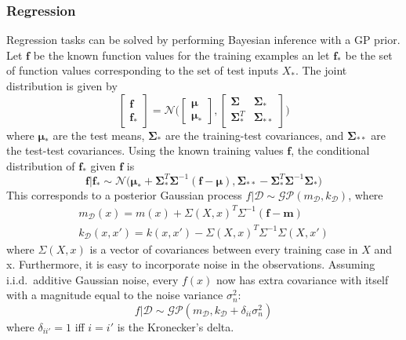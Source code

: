 \documentclass{article}
\begin{document}
\subsubsection{Regression}
Regression tasks can be solved by performing Bayesian inference with a GP prior. Let $\mathbf{f}$ be the known function values for the training examples an let $\mathbf{f}_*$ be the set of function values corresponding to the set of test inputs $X_*$. The joint distribution is given by
\begin{equation*}
\begin{bmatrix} \mathbf{f} \\ \mathbf{f}_* \end{bmatrix} 
= 
\mathcal{N}\Big(\begin{bmatrix} \bm{\mu} \\ \bm{\mu}_* \end{bmatrix}, \begin{bmatrix}\bm{\Sigma} & \bm{\Sigma}_* \\ \bm{\Sigma}_*^T & \bm{\Sigma}_{**} \end{bmatrix} \Big)
\end{equation*}
where $\bm{\mu}_*$ are the test means, $\bm{\Sigma}_*$ are the training-test covariances, and $\bm{\Sigma}_{**}$ are the test-test covariances. Using the known training values $\mathbf{f}$, the conditional distribution of $\mathbf{f}_*$ given $\mathbf{f}$ is
\begin{equation*}
	\mathbf{f} \big\vert \mathbf{f}_* \sim
	\mathcal{N} \big( \bm{\mu}_* + \mathbf{\Sigma}_*^T \mathbf{\Sigma}^{-1}(\mathbf{f}-\bm{\mu}), \mathbf{\Sigma}_{**} - \mathbf{\Sigma}^T_*\mathbf{\Sigma}^{-1}\mathbf{\Sigma}_* \big)
\end{equation*}
This corresponds to a posterior Gaussian process $f \big\vert \mathcal{D} \sim \mathcal{GP}(m_\mathcal{D}, k_\mathcal{D})$, where
\begin{align*}
	 m_\mathcal{D}(x) = m(x) + \Sigma(X,x)^T\Sigma^{-1}(\mathbf{f}-\mathbf{m})\\
	k_\mathcal{D}(x, x') = k(x, x') - \Sigma(X,x)^T\Sigma^{-1}\Sigma(X, x')
\end{align*}
where $\Sigma(X, x)$ is a vector of covariances between every training case in $X$ and x. Furthermore, it is easy to incorporate noise in the observations. Assuming i.i.d.\ additive Gaussian noise, every $f(x)$ now has extra covariance with itself with a magnitude equal to the noise variance $\sigma_n^2$:
\begin{equation*}
	f \big\vert \mathcal{D} \sim \mathcal{GP}(m_\mathcal{D}, k_\mathcal{D} + \delta_{ii} \sigma_n^2)
\end{equation*}
where $\delta_{ii'} = 1$ iff $i=i'$ is the Kronecker's delta.
\end{document}
